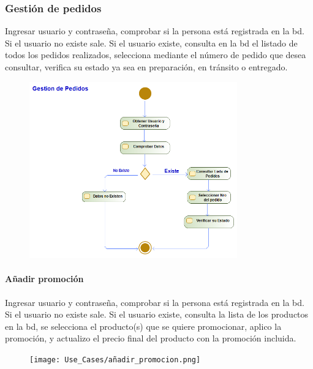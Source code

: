 \subsubsection{Gestión de pedidos}
Ingresar usuario y contraseña, comprobar si la persona está registrada en la \gls{bd}. Si el usuario no existe sale. Si el usuario existe, consulta en la \gls{bd} el listado de todos los pedidos realizados, selecciona mediante el número de pedido que desea consultar, verifica su estado ya sea en preparación, en tránsito o entregado.
\begin{figure}[H]
    \centering
    \includegraphics[width=0.8\textwidth]{Use_Cases/gestion_de_pedidos.png}
\end{figure}
\paragraph{Añadir promoción}
Ingresar usuario y contraseña, comprobar si la persona está registrada en la \gls{bd}. Si el usuario no existe sale. Si el usuario existe, consulta la lista de los productos en la \gls{bd}, se selecciona el producto(s) que se quiere promocionar, aplico la promoción, y actualizo el precio final del producto con la promoción incluida.
\begin{figure}[H]
    \centering
    \texttt{[image: Use\_Cases/añadir\_promocion.png]}
\end{figure}
